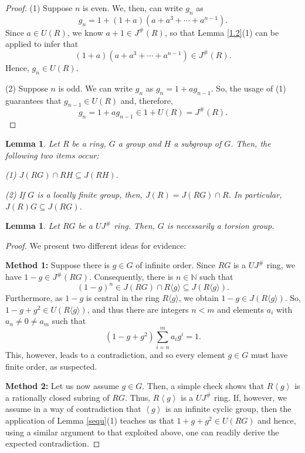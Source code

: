 \documentclass[12pt]{amsart}
\newtheorem{lemma}[theorem]{Lemma}
\theoremstyle{definition}
\begin{document}
\begin{proof}
(1) Suppose $n$ is even. We, then, can write $g_n$ as $$g_n = 1+ (1 + a)(a + a^3 + \cdots + a^{n-1}).$$ Since $a \in U(R)$, we know $a+1 \in J^{\#}(R)$, so that Lemma \ref{1.2}(1) can be applied to infer that $$(1 + a)(a + a^3 + \cdots + a^{n-1}) \in J^{\#}(R).$$ Hence, $g_n \in U(R)$.
	
(2) Suppose $n$ is odd. We can write $g_n$ as $g_n = 1+ ag_{n-1}$. So, the usage of (1) guarantees that $g_{n-1} \in U(R)$ and, therefore, $$g_n = 1 + a g_{n-1} \in 1 + U(R) = J^{\#}(R).$$
\end{proof}

\begin{lemma}\cite[Proposition 9]{con}\label{ext le}
Let $R$ be a ring, $G$ a group and $H$ a subgroup of $G$. Then, the following two items occur:
	
(1) $J(RG) \cap RH \subseteq J(RH)$.
	
(2) If $G$ is a locally finite group, then, $J(R) = J(RG) \cap R$. In particular, $J(R)G \subseteq J(RG)$.
\end{lemma}

\begin{lemma}\label{0}
Let $RG$ be a $UJ^{\#}$ ring. Then, $G$ is necessarily a torsion group.
\end{lemma}

\begin{proof} We present two different ideas for evidence:

\medskip

\textbf{Method 1:} Suppose there is $g \in G$ of infinite order. Since $RG$ is a $UJ^{\#}$ ring, we have $1-g \in J^{\#}(RG)$. Consequently, there is $n \in \mathbb{N}$ such that $$(1-g)^n \in J(RG) \cap R\langle g\rangle \subseteq J(R\langle g\rangle).$$ Furthermore, as $1-g$ is central in the ring $R\langle g\rangle$, we obtain $1-g \in J(R\langle g\rangle)$. So, $1-g+g^2 \in U(R\langle g\rangle)$, and thus there are integers $n < m$ and elements $a_i$ with $a_n \neq 0 \neq a_m$ such that
\[
	(1 - g + g^2)\sum_{i=n}^{m}a_ig^i=1.
\]
This, however, leads to a contradiction, and so every element $g \in G$ must have finite order, as suspected.

\medskip

\textbf{Method 2:} Let us now assume $g \in G$. Then, a simple check shows that $R\left\langle g \right\rangle$ is a rationally closed subring of $RG$. Thus, $R\left\langle g \right\rangle$ is a $UJ^{\#}$ ring. If, however, we assume in a way of contradiction that $\left\langle g \right\rangle$ is an infinite cyclic group, then the application of Lemma \ref{sequ}(1) teaches us that $1 + g + g^2 \in U(RG)$ and hence, using a similar argument to that exploited above, one can readily derive the expected contradiction.
\end{proof}
\end{document}

